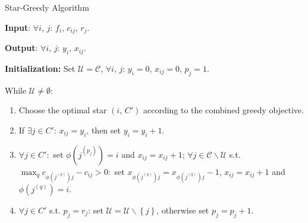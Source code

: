 \documentclass[10pt]{llncs}
\begin{document}
\begin{algorithm}[H]
{\footnotesize \caption{Star-Greedy Algorithm}
}{\footnotesize \par}

\textbf{Input}: $\forall i,\, j:\, f_{i}$, $c_{ij}$, $r_{j}$.

\textbf{Output}: $\forall i,\, j:\, y_{i}$, $x_{ij}$.

\textbf{Initialization:} Set $\mathcal{U}=\mathcal{C}$, $\forall i,\, j:\, y_{i}=0,\, x_{ij}=0,\, p_{j}=1$.

\medskip{}


While $\mathcal{U}\neq\mathcal{\emptyset}$:
\begin{enumerate}
\item Choose the optimal star $\left(i,\, C'\right)$ according to the combined
greedy objective.
\item If $\exists j\in C'$: $x_{ij}=y_{i}$, then set $y_{i}=y_{i}+1$.
\item $\forall j\in C':$ set $\phi\left(j^{\left(p_{j}\right)}\right)=i$
and $x_{ij}=x_{ij}+1$; $\forall j\in\mathcal{C}\backslash\mathcal{U}$
s.t. $\max_{q}c_{\phi\left(j^{\left(q\right)}\right)j}-c_{ij}>0:$
set $x_{\phi\left(j^{\left(q\right)}\right)j}=x_{\phi\left(j^{\left(q\right)}\right)j}-1$,
$x_{ij}=x_{ij}+1$ and $\phi\left(j^{\left(q\right)}\right)=i$.
\item $\forall j\in C'$ s.t. $p_{j}=r_{j}$: set \textbf{$\mathcal{U}=\mathcal{U}\backslash\left\{ j\right\} $},
otherwise set $p_{j}=p_{j}+1$.
\end{enumerate}
\end{algorithm}
\end{document}
